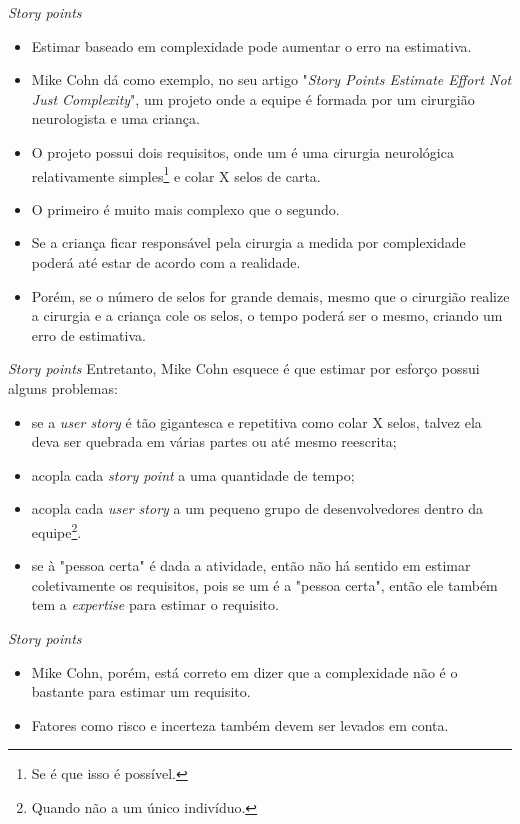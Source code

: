 \documentclass[11pt]{beamer}
\begin{document}
    \begin{frame}{\textit{Story points}}
        \begin{itemize}
            \item Estimar baseado em complexidade pode aumentar o erro na estimativa.
            \item Mike Cohn dá como exemplo, no seu artigo "\textit{Story Points Estimate Effort Not Just Complexity}", um projeto onde a equipe é formada por um cirurgião neurologista e uma criança.
            \item O projeto possui dois requisitos, onde um é uma cirurgia neurológica relativamente simples\footnote{Se é que isso é possível.} e colar X selos de carta.
            \item O primeiro é muito mais complexo que o segundo.
            \item Se a criança ficar responsável pela cirurgia a medida por complexidade poderá até estar de acordo com a realidade.
            \item Porém, se o número de selos for grande demais, mesmo que o cirurgião realize a cirurgia e a criança cole os selos, o tempo poderá ser o mesmo, criando um erro de estimativa.
        \end{itemize}
    \end{frame}

    \begin{frame}{\textit{Story points}}
        Entretanto, Mike Cohn esquece é que estimar por esforço possui alguns problemas:
        \begin{itemize}
            \item se a \textit{user story} é tão gigantesca e repetitiva como colar X selos, talvez ela deva ser quebrada em várias partes ou até mesmo reescrita;
            \item acopla cada \textit{story point} a uma quantidade de tempo;
            \item acopla cada \textit{user story} a um pequeno grupo de desenvolvedores dentro da equipe\footnote{Quando não a um único indivíduo.}.
            \item se à "pessoa certa" é dada a atividade, então não há sentido em estimar coletivamente os requisitos, pois se um é a "pessoa certa", então ele também tem a \textit{expertise} para estimar o requisito.
        \end{itemize}
    \end{frame}

    \begin{frame}{\textit{Story points}}
        \begin{itemize}
            \item Mike Cohn, porém, está correto em dizer que a complexidade não é o bastante para estimar um requisito.
            \item Fatores como risco e incerteza também devem ser levados em conta.
        \end{itemize}
    \end{frame}
\end{document}
